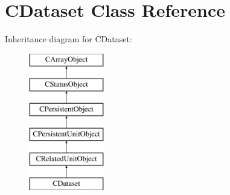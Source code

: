 \hypertarget{class_c_dataset}{\section{C\-Dataset Class Reference}
\label{class_c_dataset}
}
Inheritance diagram for C\-Dataset\-:\begin{figure}[H]
\begin{center}
\leavevmode
\includegraphics[height=6.000000cm]{class_c_dataset}
\end{center}
\end{figure}
